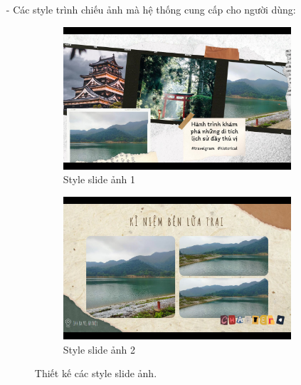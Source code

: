 \begin{enumerate}
\begin{itemize}
        \item[-] Các style trình chiếu ảnh mà hệ thống cung cấp cho người dùng:
        \begin{figure}[H]
            \centering
            \begin{subfigure}{0.48\textwidth}
                \includegraphics[width=1\linewidth]{figures/c4/4_1/slide_1.jpg} 
                \caption{Style slide ảnh 1}
            \end{subfigure}
            \hfill
            \begin{subfigure}{0.48\textwidth}
                \includegraphics[width=1\linewidth]{figures/c4/4_1/slide_2.jpg} 
                \caption{Style slide ảnh 2}
            \end{subfigure}
            \caption{Thiết kế các style slide ảnh.}
            \label{fig:slider-styles}
        \end{figure}
    \end{itemize}
    

\end{enumerate}
